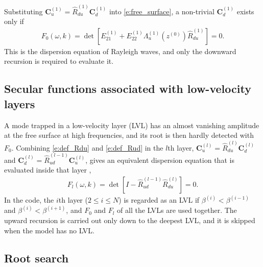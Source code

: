 \documentclass[a4paper, 10pt]{article}
\begin{document}
Substituting $\symbf{C}_u^{(1)} = \hat{R}_{du}^{(1)} \symbf{C}_d^{(1)}$ into \eqref{e:free_surface}, a non-trivial $\symbf{C}_d^{(1)}$ exists only if
\begin{align}
  F_0(\omega, k) =
  \det \left[ E_{21}^{(1)} + E_{22}^{(1)} \Lambda_u^{(1)}(z^{(0)}) \hat{R}_{du}^{(1)} \right] = 0.
  \label{e:F0}
\end{align}
This is the dispersion equation of Rayleigh waves, and only the downward recursion is required to evaluate it.

\subsection{Secular functions associated with low-velocity layers}

A mode trapped in a low-velocity layer (LVL) has an almost vanishing amplitude at the free surface at high frequencies, and its root is then hardly detected with $F_0$.
Combining \eqref{e:def_Rdu} and \eqref{e:def_Rud} in the $l$th layer, $\symbf{C}_u^{(l)} = \hat{R}_{du}^{(l)} \symbf{C}_d^{(l)}$ and $\symbf{C}_d^{(l)} = \hat{R}_{ud}^{(l - 1)} \symbf{C}_u^{(l)}$, gives an equivalent dispersion equation that is evaluated inside that layer \parencite{chen1993,he2006,wu2016},
\begin{align}
  F_l(\omega, k) =
  \det \left[ I - \hat{R}_{ud}^{(l - 1)} \hat{R}_{du}^{(l)} \right] = 0.
\end{align}
In the code, the $i$th layer ($2 \leq i \leq N$) is regarded as an LVL if $\beta^{(i)} < \beta^{(i - 1)}$ and $\beta^{(i)} < \beta^{(i + 1)}$, and $F_0$ and $F_l$ of all the LVLs are used together.
The upward recursion is carried out only down to the deepest LVL, and it is skipped when the model has no LVL.

\subsection{Root search}
\end{document}
